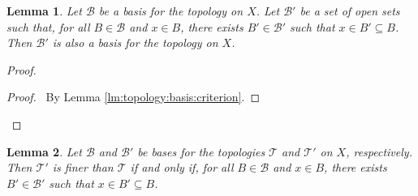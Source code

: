 \documentclass{book}
\newtheorem{lm}{Lemma}[chapter]
\theoremstyle{definition}
\begin{document}
  \begin{lm}
    \label{lm:topology:basis:criterion2}
    Let $\mathcal{B}$ be a basis for the topology on $X$. Let $\mathcal{B}'$ be 
    a 
    set of open sets such that, for all $B \in \mathcal{B}$ and $x \in B$, 
    there 
    exists $B' \in \mathcal{B}'$ such that $x \in B' \subseteq B$. Then 
    $\mathcal{B}'$ is also a basis for the topology on $X$.
  \end{lm}
  
  \begin{proof}
    \qedstep
    \begin{proof}
      \pf\ By Lemma \ref{lm:topology:basis:criterion}.
    \end{proof}
  \end{proof}
  
  \begin{lm}
    \label{lm:topology_basis:finer}
    Let $\mathcal{B}$ and $\mathcal{B}'$ be bases for the topologies 
    $\mathcal{T}$ 
    and $\mathcal{T}'$ on $X$, respectively. Then $\mathcal{T}'$ is finer than 
    $\mathcal{T}$ if and only if, for all $B \in \mathcal{B}$ and $x \in B$, 
    there 
    exists $B' \in \mathcal{B}'$ such that $x \in B' \subseteq B$.
  \end{lm}
  
\end{document}
